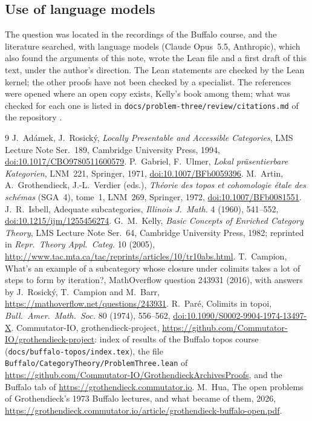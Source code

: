 \documentclass[11pt,a4paper]{amsart}
\theoremstyle{definition}
\theoremstyle{remark}
\begin{document}
\subsection*{Use of language models}
The question was located in the recordings of the Buffalo course, and the literature searched, with language models (Claude Opus~5.5, Anthropic), which also found the arguments of this note, wrote the Lean file and a first draft of this text, under the author's direction. The Lean statements are checked by the Lean kernel; the other proofs have not been checked by a specialist. The references were opened where an open copy exists, Kelly's book among them; what was checked for each one is listed in \texttt{docs/problem-three/review/citations.md} of the repository \cite{repo}.

\begin{thebibliography}{9}
 J.~Adámek, J.~Rosický, \emph{Locally Presentable and Accessible Categories}, LMS Lecture Note Ser.~189, Cambridge University Press, 1994, \href{https://doi.org/10.1017/CBO9780511600579}{doi:10.1017/CBO9780511600579}.
 P.~Gabriel, F.~Ulmer, \emph{Lokal präsentierbare Kategorien}, LNM~221, Springer, 1971, \href{https://doi.org/10.1007/BFb0059396}{doi:10.1007/BFb0059396}.
 M.~Artin, A.~Grothendieck, J.-L.~Verdier (eds.), \emph{Théorie des topos et cohomologie étale des schémas} (SGA~4), tome~1, LNM~269, Springer, 1972, \href{https://doi.org/10.1007/BFb0081551}{doi:10.1007/BFb0081551}.
 J.~R.~Isbell, Adequate subcategories, \emph{Illinois J.\ Math.} 4 (1960), 541--552, \href{https://doi.org/10.1215/ijm/1255456274}{doi:10.1215/ijm/1255456274}.
 G.~M.~Kelly, \emph{Basic Concepts of Enriched Category Theory}, LMS Lecture Note Ser.~64, Cambridge University Press, 1982; reprinted in \emph{Repr.\ Theory Appl.\ Categ.} 10 (2005), \url{http://www.tac.mta.ca/tac/reprints/articles/10/tr10abs.html}.
 T.~Campion, What's an example of a subcategory whose closure under colimits takes a lot of steps to form by iteration?, MathOverflow question 243931 (2016), with answers by J.~Rosický, T.~Campion and M.~Barr, \url{https://mathoverflow.net/questions/243931}.
 R.~Paré, Colimits in topoi, \emph{Bull.\ Amer.\ Math.\ Soc.} 80 (1974), 556--562, \href{https://doi.org/10.1090/S0002-9904-1974-13497-X}{doi:10.1090/S0002-9904-1974-13497-X}.
 Commutator-IO, grothendieck-project, \url{https://github.com/Commutator-IO/grothendieck-project}: index of results of the Buffalo topos course (\texttt{docs/buffalo-topos/index.tex}), the file \texttt{Buffalo/CategoryTheory/ProblemThree.lean} of \url{https://github.com/Commutator-IO/GrothendieckArchivesProofs}, and the Buffalo tab of \url{https://grothendieck.commutator.io}.
 M.~Hua, The open problems of Grothendieck's 1973 Buffalo lectures, and what became of them, 2026, \url{https://grothendieck.commutator.io/article/grothendieck-buffalo-open.pdf}.
\end{thebibliography}
\end{document}
